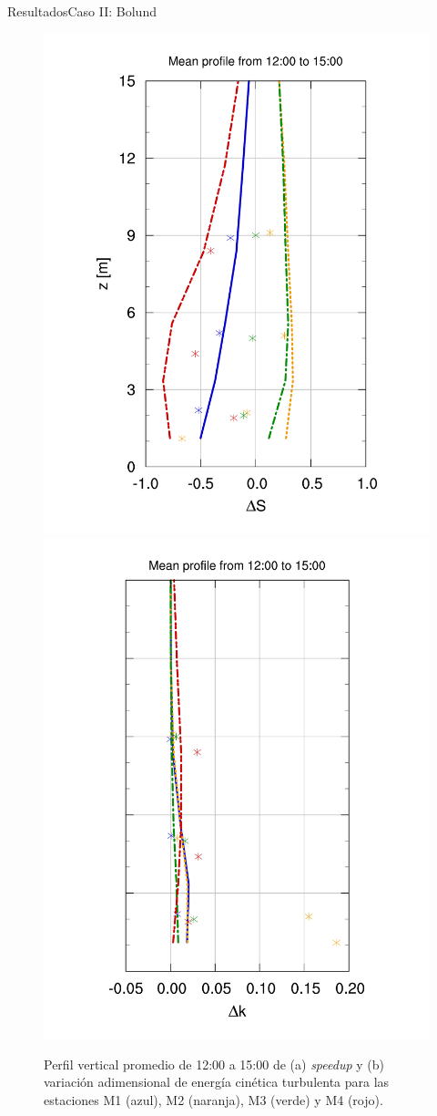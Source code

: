 \documentclass[mathserif,10pt]{beamer}
\begin{document}
\begin{frame}{Resultados}{Caso II: Bolund}
	\begin{figure}[H]
		\centering
		\includegraphics[height=0.6\linewidth,page=1,trim={28mm 10mm 25mm 23mm},clip]{fig/06/bol/V_masts}%
		\includegraphics[height=0.6\linewidth,page=1,trim={30mm 10mm 17mm 20mm},clip]{fig/06/bol/k_masts}%
		\vspace{-2mm}\caption{Perfil vertical promedio de 12:00 a 15:00 de (a) \emph{speedup} y (b) variación adimensional de energía cinética turbulenta para las estaciones M1 (azul), M2 (naranja), M3 (verde) y M4 (rojo).}
		\label{fig:06_bol_mast_tke_speedup}
	\end{figure}
\end{frame}
\end{document}
